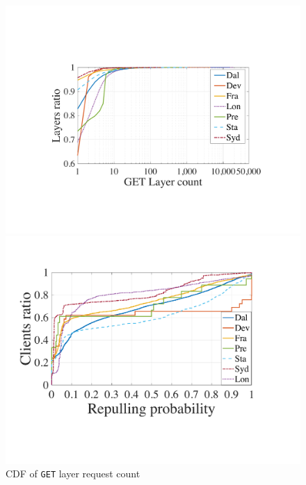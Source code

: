 
\begin{figure}[t]
        \centering
        \begin{minipage}{0.29\textwidth}
                \centering
                \includegraphics[width=\textwidth]{graphs/cdf-layer-repull-ratio-by-same-client.pdf}
                \caption{CDF of \texttt{GET} layer request count}
                \label{fig:layer-repull-cdf}
        \end{minipage}%
\hspace{1mm}
        \begin{minipage}{0.265\textwidth}
                \centering
                \includegraphics[width=\textwidth]{graphs/cdf-client-repull-layer-request-ratio.pdf}

\end{minipage}
\end{figure}
